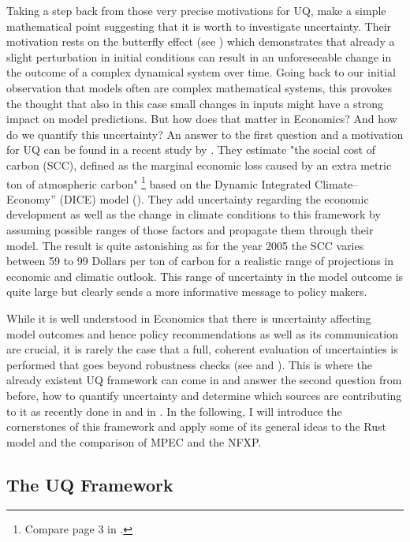 Taking a step back from those very precise motivations for UQ, \cite{Smith.2019} make a simple mathematical point suggesting that it is worth to investigate uncertainty. Their motivation rests on the butterfly effect (see \cite{Lorenz.1963}) which demonstrates that already a slight perturbation in initial conditions can result in an unforeseeable change in the outcome of a complex dynamical system over time. Going back to our initial observation that models often are complex mathematical systems, this provokes the thought that also in this case small changes in inputs might have a strong impact on model predictions. But how does that matter in Economics? And how do we quantify this uncertainty? An answer to the first question and a motivation for UQ can be found in a recent study by \cite{Cai.2019}. They estimate "the social cost of carbon (SCC), defined as the marginal economic loss caused by an extra metric ton of atmospheric carbon" \footnote{ Compare page 3 in \cite{Cai.2019}.} based on the Dynamic Integrated Climate–Economy” (DICE) model (\cite{Nordhaus.1992, Nordhaus.2008}). They add uncertainty regarding the economic development as well as the change in climate conditions to this framework by assuming possible ranges of those factors and propagate them through their model. The result is quite astonishing as for the year 2005 the SCC varies between 59 to 99 Dollars per ton of carbon for a realistic range of projections in economic and climatic outlook. This range of uncertainty in the model outcome is quite large but clearly sends a more informative message to policy makers.

While it is well understood in Economics that there is uncertainty affecting model outcomes and hence policy recommendations as well as its communication are crucial, it is rarely the case that a full, coherent evaluation of uncertainties is performed that goes beyond robustness checks (see \cite{Manski.2019} and \cite{Scheidegger.2019}). This is where the already existent UQ framework can come in and answer the second question from before, how to quantify uncertainty and determine which sources are contributing to it as recently done in \cite{Scheidegger.2019} and in \cite{Harenberg.2019}. In the following, I will introduce the cornerstones of this framework and apply some of its general ideas to the Rust model and the comparison of MPEC and the NFXP.

\subsection{The UQ Framework}

